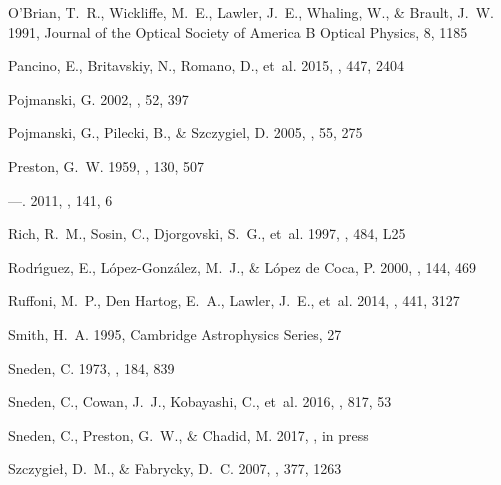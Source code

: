\documentclass[preprint]{aastex6}
\begin{document}
\begin{thebibliography}{}
{O'Brian}, T.~R., {Wickliffe}, M.~E., {Lawler}, J.~E., {Whaling}, W., \&
  {Brault}, J.~W. 1991, Journal of the Optical Society of America B Optical
  Physics, 8, 1185

{Pancino}, E., {Britavskiy}, N., {Romano}, D., {et~al.} 2015, \mnras, 447, 2404

{Pojmanski}, G. 2002, \actaa, 52, 397

{Pojmanski}, G., {Pilecki}, B., \& {Szczygiel}, D. 2005, \actaa, 55, 275

{Preston}, G.~W. 1959, \apj, 130, 507

---. 2011, \aj, 141, 6

{Rich}, R.~M., {Sosin}, C., {Djorgovski}, S.~G., {et~al.} 1997, \apjl, 484, L25

{Rodr{\'{\i}}guez}, E., {L{\'o}pez-Gonz{\'a}lez}, M.~J., \& {L{\'o}pez de
  Coca}, P. 2000, \aaps, 144, 469

{Ruffoni}, M.~P., {Den Hartog}, E.~A., {Lawler}, J.~E., {et~al.} 2014, \mnras,
  441, 3127

{Smith}, H.~A. 1995, Cambridge Astrophysics Series, 27

{Sneden}, C. 1973, \apj, 184, 839

{Sneden}, C., {Cowan}, J.~J., {Kobayashi}, C., {et~al.} 2016, \apj, 817, 53

{Sneden}, C., {Preston}, G.~W., \& {Chadid}, M. 2017, \apj, in press

{Szczygie{\l}}, D.~M., \& {Fabrycky}, D.~C. 2007, \mnras, 377, 1263


\end{thebibliography}
\end{document}
